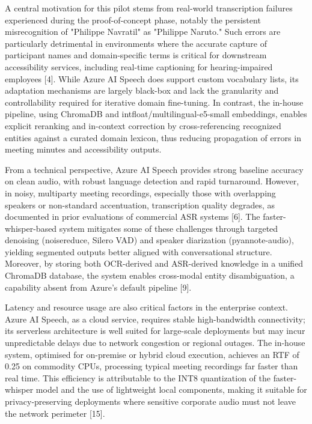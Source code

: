 \documentclass[12pt,a4paper]{article}
\begin{document}
A central motivation for this pilot stems from real-world transcription failures experienced during the proof-of-concept phase, notably the persistent misrecognition of "Philippe Navratil" as "Philippe Naruto." Such errors are particularly detrimental in environments where the accurate capture of participant names and domain-specific terms is critical for downstream accessibility services, including real-time captioning for hearing-impaired employees [4]. While Azure AI Speech does support custom vocabulary lists, its adaptation mechanisms are largely black-box and lack the granularity and controllability required for iterative domain fine-tuning. In contrast, the in-house pipeline, using ChromaDB and intfloat/multilingual-e5-small embeddings, enables explicit reranking and in-context correction by cross-referencing recognized entities against a curated domain lexicon, thus reducing propagation of errors in meeting minutes and accessibility outputs.


From a technical perspective, Azure AI Speech provides strong baseline accuracy on clean audio, with robust language detection and rapid turnaround. However, in noisy, multiparty meeting recordings, especially those with overlapping speakers or non-standard accentuation, transcription quality degrades, as documented in prior evaluations of commercial ASR systems [6]. The faster-whisper-based system mitigates some of these challenges through targeted denoising (noisereduce, Silero VAD) and speaker diarization (pyannote-audio), yielding segmented outputs better aligned with conversational structure. Moreover, by storing both OCR-derived and ASR-derived knowledge in a unified ChromaDB database, the system enables cross-modal entity disambiguation, a capability absent from Azure's default pipeline [9].


Latency and resource usage are also critical factors in the enterprise context. Azure AI Speech, as a cloud service, requires stable high-bandwidth connectivity; its serverless architecture is well suited for large-scale deployments but may incur unpredictable delays due to network congestion or regional outages. The in-house system, optimised for on-premise or hybrid cloud execution, achieves an RTF of 0.25 on commodity CPUs, processing typical meeting recordings far faster than real time. This efficiency is attributable to the INT8 quantization of the faster-whisper model and the use of lightweight local components, making it suitable for privacy-preserving deployments where sensitive corporate audio must not leave the network perimeter [15].
\end{document}

